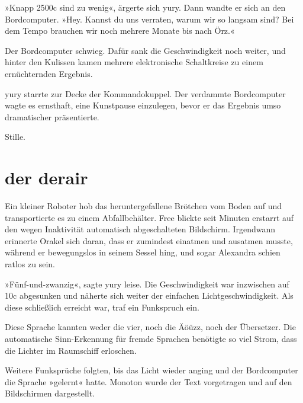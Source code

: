 »Knapp 2500c sind zu wenig«, ärgerte sich yury. Dann wandte er sich an den Bordcomputer. »Hey. Kannst du uns verraten, warum wir so langsam sind? Bei dem Tempo brauchen wir noch mehrere Monate bis nach Örz.«

Der Bordcomputer schwieg. Dafür sank die Geschwindigkeit noch weiter, und hinter den Kulissen kamen mehrere elektronische Schaltkreise zu einem ernüchternden Ergebnis.


yury starrte zur Decke der Kommandokuppel. Der verdammte Bordcomputer wagte es ernsthaft, eine Kunstpause einzulegen, bevor er das Ergebnis umso dramatischer präsentierte.


\bigskip

Stille.


\chapter{der derair}

Ein kleiner Roboter hob das heruntergefallene Brötchen vom Boden auf und transportierte es zu einem Abfallbehälter. Free blickte seit Minuten erstarrt auf den wegen Inaktivität automatisch abgeschalteten Bildschirm. Irgendwann erinnerte Orakel sich daran, dass er zumindest einatmen und ausatmen musste, während er bewegungslos in seinem Sessel hing, und sogar Alexandra schien ratlos zu sein.

»Fünf-und-zwanzig«, sagte yury leise. Die Geschwindigkeit war inzwischen auf 10c abgesunken und näherte sich weiter der einfachen Lichtgeschwindigkeit. Als diese schließlich erreicht war, traf ein Funkspruch ein.


Diese Sprache kannten weder die vier, noch die Äöüzz, noch der Übersetzer. Die automatische Sinn-Erkennung für fremde Sprachen benötigte so viel Strom, dass die Lichter im Raumschiff erloschen.

Weitere Funksprüche folgten, bis das Licht wieder anging und der Bordcomputer die Sprache »gelernt« hatte. Monoton wurde der Text vorgetragen und auf den Bildschirmen dargestellt.

